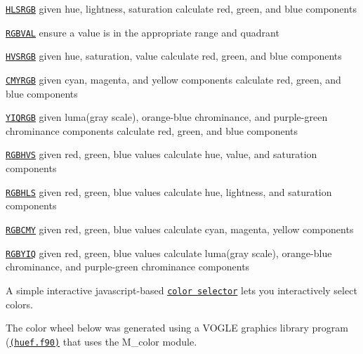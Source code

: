 \begin{DoxyDescription}
\begin{DoxyItemize}
\item \href{#HLSRGB}{\tt H\+L\+S\+R\+GB} given hue, lightness, saturation calculate red, green, and blue components 
\begin{DoxyItemize}
\item \href{#RGBVAL}{\tt R\+G\+B\+V\+AL} ensure a value is in the appropriate range and quadrant  
\end{DoxyItemize}
\item \href{#HVSRGB}{\tt H\+V\+S\+R\+GB} given hue, saturation, value calculate red, green, and blue components  
\item \href{#CMYRGB}{\tt C\+M\+Y\+R\+GB} given cyan, magenta, and yellow components calculate red, green, and blue components  
\item \href{#YIQRGB}{\tt Y\+I\+Q\+R\+GB} given luma(gray scale), orange-\/blue chrominance, and purple-\/green chrominance components calculate red, green, and blue components 


\item \href{#RGBHVS}{\tt R\+G\+B\+H\+VS} given red, green, blue values calculate hue, value, and saturation components  
\item \href{#RGBHLS}{\tt R\+G\+B\+H\+LS} given red, green, blue values calculate hue, lightness, and saturation components  
\item \href{#RGBCMY}{\tt R\+G\+B\+C\+MY} given red, green, blue values calculate cyan, magenta, yellow components  
\item \href{#RGBYIQ}{\tt R\+G\+B\+Y\+IQ} given red, green, blue values calculate luma(gray scale), orange-\/blue chrominance, and purple-\/green chrominance components 


\end{DoxyItemize}


\item[S\+EE A\+L\+SO  ]



A simple interactive javascript-\/based \href{../../../public_html/javascript/color/iframe.html}{\tt color selector} lets you interactively select colors. 





The color wheel below was generated using a V\+O\+G\+LE graphics library program (\href{../../../libvogle/EXE/TESTS/huef.F90}{\tt (huef.\+f90)} that uses the M\+\_\+color module. 



\begin{center}  \end{center} 





\end{DoxyDescription}
